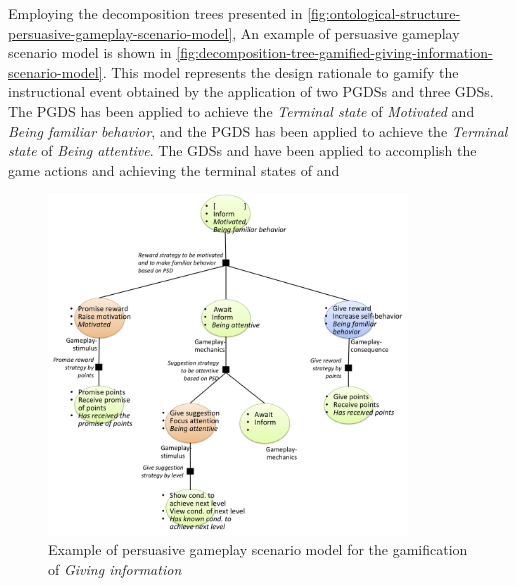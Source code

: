 Employing the decomposition trees presented in \autoref{fig:ontological-structure-persuasive-gameplay-scenario-model},
An example of persuasive gameplay scenario model is shown in \autoref{fig:decomposition-tree-gamified-giving-information-scenario-model}.
This model represents the design rationale to gamify the instructional event  obtained by the application of two PGDSs and three GDSs. The PGDS  has been applied to achieve the \emph{Terminal state} of \emph{Motivated} and \emph{Being familiar behavior}, and the PGDS  has been applied to achieve the \emph{Terminal state} of \emph{Being attentive}. 
The GDSs   and  have been applied to accomplish the game actions   and  achieving the terminal states of   and 

\begin{figure}[!htb]
 \caption{Example of persuasive gameplay scenario model for the gamification of \emph{Giving information}}
 \label{fig:decomposition-tree-gamified-giving-information-scenario-model}
 \centering
 \includegraphics[width=0.85\textwidth]{images/chap-ontogacles2/decomposition-tree-gamified-giving-information-scenario-model.png}
 \fautor
\end{figure}


